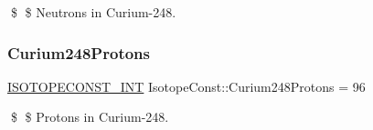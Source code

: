 \$ \$ Neutrons in Curium-\/248. \mbox{\label{group___isotope_const-_curium-_cm248_ga2bf4d863cd2a922c70c313982a908567}} 
\subsubsection{\texorpdfstring{Curium248\+Protons}{Curium248Protons}}
{\footnotesize\ttfamily \mbox{\hyperlink{group___isotope_const-_macros_ga5f18360b3e99483a35c32d789e62621c}{I\+S\+O\+T\+O\+P\+E\+C\+O\+N\+S\+T\+\_\+\+I\+NT}} Isotope\+Const\+::\+Curium248\+Protons = 96}

\$ \$ Protons in Curium-\/248. 